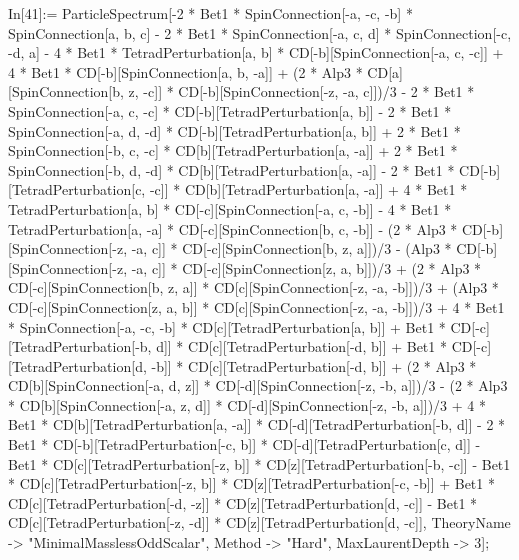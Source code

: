 In[41]:= ParticleSpectrum[-2 * Bet1 * SpinConnection[-a, -c, -b] * SpinConnection[a, b, c] - 2 * Bet1 * SpinConnection[-a, c, d] * SpinConnection[-c, -d, a] - 4 * Bet1 * TetradPerturbation[a, b] * CD[-b][SpinConnection[-a, c, -c]] + 4 * Bet1 * CD[-b][SpinConnection[a, b, -a]] + (2 * Alp3 * CD[a][SpinConnection[b, z, -c]] * CD[-b][SpinConnection[-z, -a, c]])/3 - 2 * Bet1 * SpinConnection[-a, c, -c] * CD[-b][TetradPerturbation[a, b]] - 2 * Bet1 * SpinConnection[-a, d, -d] * CD[-b][TetradPerturbation[a, b]] + 2 * Bet1 * SpinConnection[-b, c, -c] * CD[b][TetradPerturbation[a, -a]] + 2 * Bet1 * SpinConnection[-b, d, -d] * CD[b][TetradPerturbation[a, -a]] - 2 * Bet1 * CD[-b][TetradPerturbation[c, -c]] * CD[b][TetradPerturbation[a, -a]] + 4 * Bet1 * TetradPerturbation[a, b] * CD[-c][SpinConnection[-a, c, -b]] - 4 * Bet1 * TetradPerturbation[a, -a] * CD[-c][SpinConnection[b, c, -b]] - (2 * Alp3 * CD[-b][SpinConnection[-z, -a, c]] * CD[-c][SpinConnection[b, z, a]])/3 - (Alp3 * CD[-b][SpinConnection[-z, -a, c]] * CD[-c][SpinConnection[z, a, b]])/3 + (2 * Alp3 * CD[-c][SpinConnection[b, z, a]] * CD[c][SpinConnection[-z, -a, -b]])/3 + (Alp3 * CD[-c][SpinConnection[z, a, b]] * CD[c][SpinConnection[-z, -a, -b]])/3 + 4 * Bet1 * SpinConnection[-a, -c, -b] * CD[c][TetradPerturbation[a, b]] + Bet1 * CD[-c][TetradPerturbation[-b, d]] * CD[c][TetradPerturbation[-d, b]] + Bet1 * CD[-c][TetradPerturbation[d, -b]] * CD[c][TetradPerturbation[-d, b]] + (2 * Alp3 * CD[b][SpinConnection[-a, d, z]] * CD[-d][SpinConnection[-z, -b, a]])/3 - (2 * Alp3 * CD[b][SpinConnection[-a, z, d]] * CD[-d][SpinConnection[-z, -b, a]])/3 + 4 * Bet1 * CD[b][TetradPerturbation[a, -a]] * CD[-d][TetradPerturbation[-b, d]] - 2 * Bet1 * CD[-b][TetradPerturbation[-c, b]] * CD[-d][TetradPerturbation[c, d]] - Bet1 * CD[c][TetradPerturbation[-z, b]] * CD[z][TetradPerturbation[-b, -c]] - Bet1 * CD[c][TetradPerturbation[-z, b]] * CD[z][TetradPerturbation[-c, -b]] + Bet1 * CD[c][TetradPerturbation[-d, -z]] * CD[z][TetradPerturbation[d, -c]] - Bet1 * CD[c][TetradPerturbation[-z, -d]] * CD[z][TetradPerturbation[d, -c]], TheoryName -> "MinimalMasslessOddScalar", Method -> "Hard", MaxLaurentDepth -> 3]; 